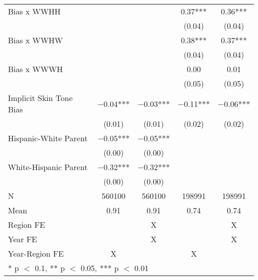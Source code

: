 \begin{longtable}[t]{lcccc}
Bias x WWHH &  &  & \num{0.37}*** & \num{0.36}***\\
 &  &  & (\num{0.04}) & \vphantom{1} (\num{0.04})\\
Bias x WWHW &  &  & \num{0.38}*** & \num{0.37}***\\
 &  &  & (\num{0.04}) & (\num{0.04})\\
Bias x WWWH &  &  & \num{0.00} & \num{0.01}\\
 &  &  & (\num{0.05}) & (\num{0.05})\\
Implicit Skin Tone Bias & \num{-0.04}*** & \num{-0.03}*** & \num{-0.11}*** & \num{-0.06}***\\
 & (\num{0.01}) & (\num{0.01}) & (\num{0.02}) & (\num{0.02})\\
Hispanic-White Parent & \num{-0.05}*** & \num{-0.05}*** &  & \\
 & (\num{0.00}) & (\num{0.00}) &  \vphantom{1} & \\
White-Hispanic Parent & \num{-0.32}*** & \num{-0.32}*** &  & \\
 & (\num{0.00}) & (\num{0.00}) &  & \\
\midrule
N & \num{560100} & \num{560100} & \num{198991} & \num{198991}\\
Mean & \num{0.91} & \num{0.91} & \num{0.74} & \num{0.74}\\
Region FE &  & X &  & X\\
Year FE &  & X &  & X\\
Year-Region FE & X &  & X & \\*
\multicolumn{5}{l}{\rule{0pt}{1em}* p $<$ 0.1, ** p $<$ 0.05, *** p $<$ 0.01}\\
\end{longtable}
